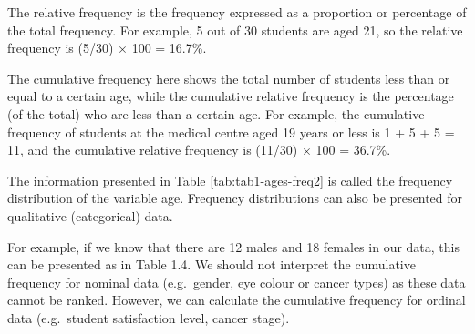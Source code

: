 \documentclass[
]{memoir}
\begin{document}
The relative frequency is the frequency expressed as a proportion or percentage of the total frequency. For example, 5 out of 30 students are aged 21, so the relative frequency is (5/30) \(\times\) 100 = 16.7\%.

The cumulative frequency here shows the total number of students less than or equal to a certain age, while the cumulative relative frequency is the percentage (of the total) who are less than a certain age. For example, the cumulative frequency of students at the medical centre aged 19 years or less is 1 + 5 + 5 = 11, and the cumulative relative frequency is (11/30) \(\times\) 100 = 36.7\%.

The information presented in Table \ref{tab:tab1-ages-freq2} is called the frequency distribution of the variable age. Frequency distributions can also be presented for qualitative (categorical) data.

For example, if we know that there are 12 males and 18 females in our data, this can be presented as in Table 1.4. We should not interpret the cumulative frequency for nominal data (e.g.~gender, eye colour or cancer types) as these data cannot be ranked. However, we can calculate the cumulative frequency for ordinal data (e.g.~student satisfaction level, cancer stage).

 
  \providecommand{\huxb}[2]{\arrayrulecolor[RGB]{#1}\global\arrayrulewidth=#2pt}
  \providecommand{\huxvb}[2]{\color[RGB]{#1}\vrule width #2pt}
  \providecommand{\huxtpad}[1]{\rule{0pt}{#1}}
  \providecommand{\huxbpad}[1]{\rule[-#1]{0pt}{#1}}
\end{document}
